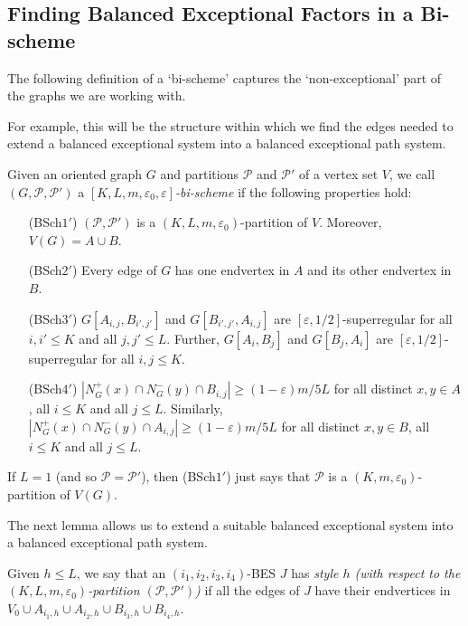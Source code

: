 \documentclass{memo-l}
\def\COMMENT#1{}
\def\cP{\mathcal{P}}
\def\eps{\varepsilon}
\numberwithin{section}{chapter}
\numberwithin{equation}{section}
\numberwithin{firstthm}{section}
\numberwithin{figure}{section}
\begin{document}
{%

\subsection{Finding Balanced Exceptional Factors in a Bi-scheme}\label{sec:findBFq}
The following definition of a `bi-scheme' captures the `non-exceptional' part of the graphs we are working with.%
\COMMENT{osthus added para}
For example, this will be the structure within which we find the edges needed to extend a balanced exceptional system into a balanced exceptional path system.


Given an oriented graph $G$ and partitions $\mathcal P$ and $\cP'$ of a vertex set $V$, we call $(G, \mathcal{P},\mathcal{P}')$ a
\emph{$[K,L,m,\eps_0,\eps]$-bi-scheme} if the following properties hold:
\begin{itemize}
\item[(BSch$1'$)] $(\mathcal{P},\mathcal{P}')$ is a $(K,L,m,\eps_0)$-partition of $V$. Moreover, $V(G)=A\cup B$.
\item[(BSch$2'$)] Every edge of $G$ has one endvertex in $A$ and its other endvertex in~$B$.
\item[(BSch$3'$)] $G[A_{i,j},B_{i',j'}]$ and $G[B_{i',j'}, A_{i,j}]$ are $[\eps, 1/2]$-superregular
for all $i, i'\le K$ and all $j, j' \leq L$. Further, $G[A_i,B_j]$ and $G[B_j,A_i]$ are $[\eps, 1/2]$-superregular
for all $i,j \leq K$.
\item[(BSch$4'$)] $|N_{G}^+(x)\cap N_{G}^-(y)\cap B_{i,j}|\ge (1-\eps) m/5L$ for all distinct $x,y\in A$, all $i\le K$ and all $j\le L$.
Similarly, $|N_{G}^+(x)\cap N_{G}^-(y)\cap A_{i,j}|\ge(1-\eps)  m/5L$ for all distinct $x,y\in B$, all $i\le K$ and all $j\le L$.\COMMENT{NOTE! added error term here!}
\end{itemize}
If $L=1$ (and so $\cP=\cP'$), then (BSch$1'$) just says that
$\mathcal{P}$ is a $(K,m,\eps_0)$-partition of $V(G)$.%
    \COMMENT{AL:removed notation for $[K,m, \eps_0, \eps]$}

The next lemma allows us to extend a suitable balanced exceptional system into a balanced exceptional path system.%
   \COMMENT{It does not seem to be possible to unify this in a simple way with the balancing lemma of the approximate cover chapter}
Given $h\le L$, we say that an $(i_1, i_2 , i_3 , i_4)$-BES $J$ has \emph{style $h$ (with respect to the $(K,L,m,\eps_0)$-partition
$(\mathcal{P},\mathcal{P}')$)} if all the edges of $J$
have their endvertices in $V_0\cup A_{i_1,h}\cup A_{i_2,h}\cup B_{i_3,h}\cup B_{i_4,h}$.

}
\end{document}

